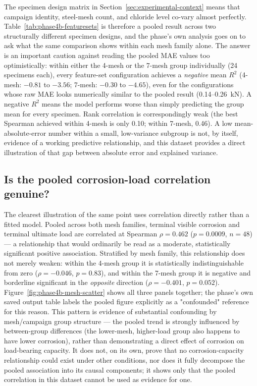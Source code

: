 The specimen design matrix in Section~\ref{sec:experimental-context} means
that campaign identity, steel-mesh count, and chloride level co-vary almost
perfectly. Table~\ref{tab:phase4b-featuresets} is therefore a pooled result
across two structurally different specimen designs, and the phase's own
analysis goes on to ask what the same comparison shows within each
mesh family alone. The answer is an important caution against reading the
pooled MAE values too optimistically: within either the 4-mesh or the
7-mesh group individually (24 specimens each), every feature-set
configuration achieves a \emph{negative} mean $R^2$ (4-mesh: $-0.81$ to
$-3.56$; 7-mesh: $-0.30$ to $-4.65$), even for the configurations whose raw
MAE looks numerically similar to the pooled result (0.14–0.26~kN). A
negative $R^2$ means the model performs worse than simply predicting the
group mean for every specimen. Rank correlation is correspondingly weak
(the best Spearman achieved within 4-mesh is only 0.10; within 7-mesh,
0.46). A low mean-absolute-error number within a small, low-variance
subgroup is not, by itself, evidence of a working predictive relationship,
and this dataset provides a direct illustration of that gap between
absolute error and explained variance.

\subsection{Is the pooled corrosion-load correlation genuine?}

The clearest illustration of the same point uses correlation directly
rather than a fitted model. Pooled across both mesh families, terminal
visible corrosion and terminal ultimate load are correlated at Spearman
$\rho=0.462$ ($p=0.0009$, $n=48$) — a relationship that would ordinarily be
read as a moderate, statistically significant positive association.
Stratified by mesh family, this relationship does not merely weaken: within
the 4-mesh group it is statistically indistinguishable from zero
($\rho=-0.046$, $p=0.83$), and within the 7-mesh group it is negative and
borderline significant in the \emph{opposite} direction ($\rho=-0.401$,
$p=0.052$). Figure~\ref{fig:phase4b-mesh-scatter} shows all three panels
together; the phase's own saved output table labels the pooled figure
explicitly as a "confounded" reference for this reason. This pattern is
evidence of substantial confounding by mesh/campaign group structure — the
pooled trend is strongly influenced by between-group differences (the
lower-mesh, higher-load group also happens to have lower corrosion), rather
than demonstrating a direct effect of corrosion on load-bearing capacity.
It does not, on its own, prove that no corrosion-capacity relationship
could exist under other conditions, nor does it fully decompose the pooled
association into its causal components; it shows only that the pooled
correlation in this dataset cannot be used as evidence for one.

